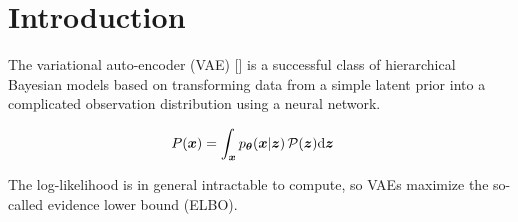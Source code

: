 \section{Introduction}
\label{sec:introduction}

The variational auto-encoder (VAE) [] is a successful class of hierarchical Bayesian models based on transforming data from a simple latent prior into a complicated observation distribution using a neural network.

\begin{align*}
    P({\boldsymbol{x}}) &= \int_{\boldsymbol{x}} p_{{\boldsymbol \theta}}({\boldsymbol{x}} | {\boldsymbol z})\, \mathcal{P}({\boldsymbol z}) \mathrm{d}{\boldsymbol z}
\end{align*}

The log-likelihood is in general intractable to compute, so VAEs maximize the so-called evidence lower bound (ELBO).





